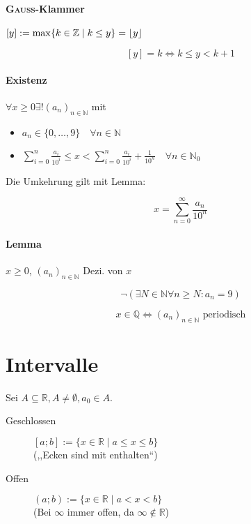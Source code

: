 \paragraph{\textsc{Gauss}-Klammer}
$[y] := \max \{ k \in \mathbb{Z} \mid k \leq y \} = \lfloor y\rfloor$

$$[y] = k \Leftrightarrow k \leq y < k + 1$$

\paragraph{Existenz} $\forall x \geq 0 \exists ! (a_n)_{n \in \mathbb{N}}$ mit

\begin{itemize}
      \item $a_n \in \{ 0, \dots, 9 \} \quad \forall n \in \mathbb{N}$
      \item $\sum_{i = 0}^n \frac{a_i}{10^i} \leq x < \sum_{i = 0}^n \frac{a_i}{10^i} + \frac{1}{10^n} \quad \forall n \in \mathbb{N}_0$
\end{itemize}

Die Umkehrung gilt mit Lemma:

$$x = \sum_{n = 0}^\infty \frac{a_n}{10^n}$$

\paragraph{Lemma} $x \geq 0$, $(a_n)_{n \in \mathbb{N}}$ Dezi. von $x$

$$\boldsymbol{\neg} (\exists N \in \mathbb{N} \forall n \geq N: a_n = 9)$$

$$x \in \mathbb{Q} \Leftrightarrow (a_n)_{n \in \mathbb{N}} \text{ periodisch}$$

\section{Intervalle}

Sei $A \subseteq \mathbb{R}, A \neq \emptyset, a_0 \boldsymbol{\in} A$.

\begin{description}
      \item [Geschlossen]
            $[a;b] := \{ x \in \mathbb{R} \mid a \boldsymbol{\leq} x \boldsymbol{\leq} b \}$ \\
            (,,Ecken sind mit enthalten``)

      \item [Offen]
            $(a;b) := \{x \in \mathbb{R} \mid a \boldsymbol{<} x \boldsymbol{<} b\}$ \\
            (Bei $\infty$ immer offen, da $\infty \notin \mathbb{R}$)
\end{description}

